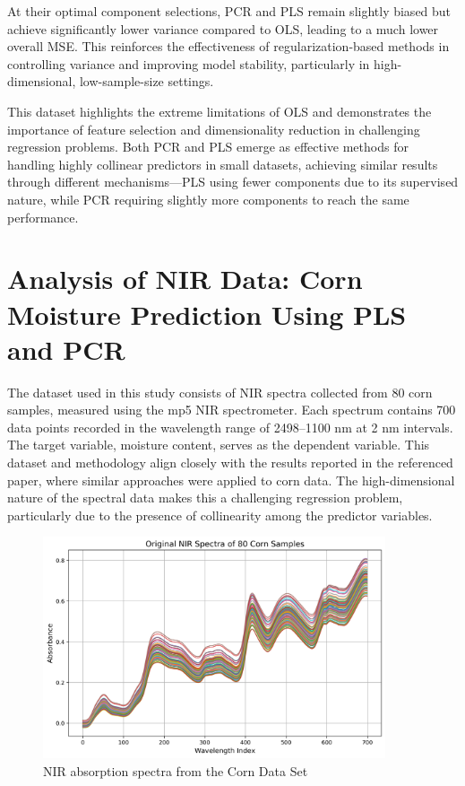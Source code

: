 \documentclass[11pt,twoside,a4paper]{article}
\begin{document}
At their optimal component selections, PCR and PLS remain slightly biased but achieve significantly lower variance compared to OLS, leading to a much lower overall MSE. This reinforces the effectiveness of regularization-based methods in controlling variance and improving model stability, particularly in high-dimensional, low-sample-size settings.

This dataset highlights the extreme limitations of OLS and demonstrates the importance of feature selection and dimensionality reduction in challenging regression problems. Both PCR and PLS emerge as effective methods for handling highly collinear predictors in small datasets, achieving similar results through different mechanisms—PLS using fewer components due to its supervised nature, while PCR requiring slightly more components to reach the same performance.

\section{Analysis of NIR Data: Corn Moisture Prediction Using PLS and PCR}

The dataset used in this study consists of NIR spectra collected from 80 corn samples, measured using the mp5 NIR spectrometer. Each spectrum contains 700 data points recorded in the wavelength range of 2498–1100 nm at 2 nm intervals. The target variable, moisture content, serves as the dependent variable. This dataset and methodology align closely with the results reported in the referenced paper, where similar approaches were applied to corn data. The high-dimensional nature of the spectral data makes this a challenging regression problem, particularly due to the presence of collinearity among the predictor variables.

\begin{figure}[H]
    \centering
    \includegraphics[width=0.9\textwidth]{NIR_first_plot.png}
    \caption{NIR absorption spectra from the Corn Data Set}
    \label{fig:NIR_analysis}
\end{figure}
\end{document}
